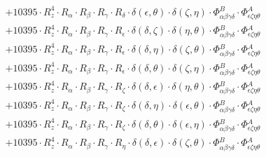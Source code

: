 \documentclass{article}
\begin{document}
\begin{equation}
\begin{array}{c}
 \\[0.2em] 		 + 10395 \cdot R_{z}^{4} \cdot R_{\alpha{}} \cdot R_{\beta{}} \cdot R_{\gamma{}} \cdot R_{\delta{}} \cdot \delta{}\left(\epsilon{}, \theta{}\right) \cdot \delta{}\left(\zeta{}, \eta{}\right) \cdot \Phi{}^{B}_{\alpha{}\beta{}\gamma{}\delta{}} \cdot \Phi{}^{A}_{\epsilon{}\zeta{}\eta{}\theta{}} 
 \\[0.2em] 		 + 10395 \cdot R_{z}^{4} \cdot R_{\alpha{}} \cdot R_{\beta{}} \cdot R_{\gamma{}} \cdot R_{\epsilon{}} \cdot \delta{}\left(\delta{}, \zeta{}\right) \cdot \delta{}\left(\eta{}, \theta{}\right) \cdot \Phi{}^{B}_{\alpha{}\beta{}\gamma{}\delta{}} \cdot \Phi{}^{A}_{\epsilon{}\zeta{}\eta{}\theta{}} 
 \\[0.2em] 		 + 10395 \cdot R_{z}^{4} \cdot R_{\alpha{}} \cdot R_{\beta{}} \cdot R_{\gamma{}} \cdot R_{\epsilon{}} \cdot \delta{}\left(\delta{}, \eta{}\right) \cdot \delta{}\left(\zeta{}, \theta{}\right) \cdot \Phi{}^{B}_{\alpha{}\beta{}\gamma{}\delta{}} \cdot \Phi{}^{A}_{\epsilon{}\zeta{}\eta{}\theta{}} 
 \\[0.2em] 		 + 10395 \cdot R_{z}^{4} \cdot R_{\alpha{}} \cdot R_{\beta{}} \cdot R_{\gamma{}} \cdot R_{\epsilon{}} \cdot \delta{}\left(\delta{}, \theta{}\right) \cdot \delta{}\left(\zeta{}, \eta{}\right) \cdot \Phi{}^{B}_{\alpha{}\beta{}\gamma{}\delta{}} \cdot \Phi{}^{A}_{\epsilon{}\zeta{}\eta{}\theta{}} 
 \\[0.2em] 		 + 10395 \cdot R_{z}^{4} \cdot R_{\alpha{}} \cdot R_{\beta{}} \cdot R_{\gamma{}} \cdot R_{\zeta{}} \cdot \delta{}\left(\delta{}, \epsilon{}\right) \cdot \delta{}\left(\eta{}, \theta{}\right) \cdot \Phi{}^{B}_{\alpha{}\beta{}\gamma{}\delta{}} \cdot \Phi{}^{A}_{\epsilon{}\zeta{}\eta{}\theta{}} 
 \\[0.2em] 		 + 10395 \cdot R_{z}^{4} \cdot R_{\alpha{}} \cdot R_{\beta{}} \cdot R_{\gamma{}} \cdot R_{\zeta{}} \cdot \delta{}\left(\delta{}, \eta{}\right) \cdot \delta{}\left(\epsilon{}, \theta{}\right) \cdot \Phi{}^{B}_{\alpha{}\beta{}\gamma{}\delta{}} \cdot \Phi{}^{A}_{\epsilon{}\zeta{}\eta{}\theta{}} 
 \\[0.2em] 		 + 10395 \cdot R_{z}^{4} \cdot R_{\alpha{}} \cdot R_{\beta{}} \cdot R_{\gamma{}} \cdot R_{\zeta{}} \cdot \delta{}\left(\delta{}, \theta{}\right) \cdot \delta{}\left(\epsilon{}, \eta{}\right) \cdot \Phi{}^{B}_{\alpha{}\beta{}\gamma{}\delta{}} \cdot \Phi{}^{A}_{\epsilon{}\zeta{}\eta{}\theta{}} 
 \\[0.2em] 		 + 10395 \cdot R_{z}^{4} \cdot R_{\alpha{}} \cdot R_{\beta{}} \cdot R_{\gamma{}} \cdot R_{\eta{}} \cdot \delta{}\left(\delta{}, \epsilon{}\right) \cdot \delta{}\left(\zeta{}, \theta{}\right) \cdot \Phi{}^{B}_{\alpha{}\beta{}\gamma{}\delta{}} \cdot \Phi{}^{A}_{\epsilon{}\zeta{}\eta{}\theta{}} 

\end{array}
\end{equation}
\end{document}
